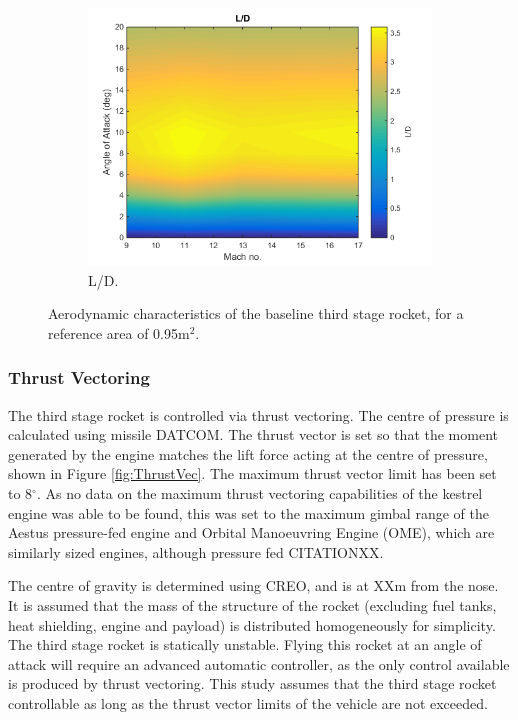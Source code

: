 \begin{figure}
\begin{subfigure}{.5\textwidth}
				\includegraphics[width=0.99\linewidth]{figures/3_vehicle_design/ThirdStageLD}
				\caption{L/D.}
				\label{fig:LD-ThirdStage}
			\end{subfigure}
			\caption{Aerodynamic characteristics of the baseline third stage rocket, for a reference area of 0.95m$^2$.}
			\label{fig:ThirdStageAero}
		\end{figure}
		
		
		
		\subsubsection{Thrust Vectoring}\label{sec:thrustvectoring}
		
		The third stage rocket is controlled via thrust vectoring. The centre of pressure is calculated using missile DATCOM. The thrust vector is set so that the moment generated by the engine matches the lift force acting at the centre of pressure, shown in Figure \ref{fig:ThrustVec}. The maximum thrust vector limit has been set to 8$^\circ$. As no data on the maximum thrust vectoring capabilities of the kestrel engine was able to be found, this was set to the maximum gimbal range of the Aestus pressure-fed engine and Orbital Manoeuvring Engine (OME), which are similarly sized engines, although pressure fed CITATIONXX.
		
			The centre of gravity is determined using CREO, and is at XXm from the nose. It is assumed that the mass of the structure of the rocket (excluding fuel tanks, heat shielding, engine and payload) is distributed homogeneously for simplicity.
		The third stage rocket is statically unstable. Flying this rocket at an angle of attack will require an advanced automatic controller, as the only control available is produced by thrust vectoring. This study assumes that the third stage rocket controllable as long as the thrust vector limits of the vehicle are not exceeded. 
		
